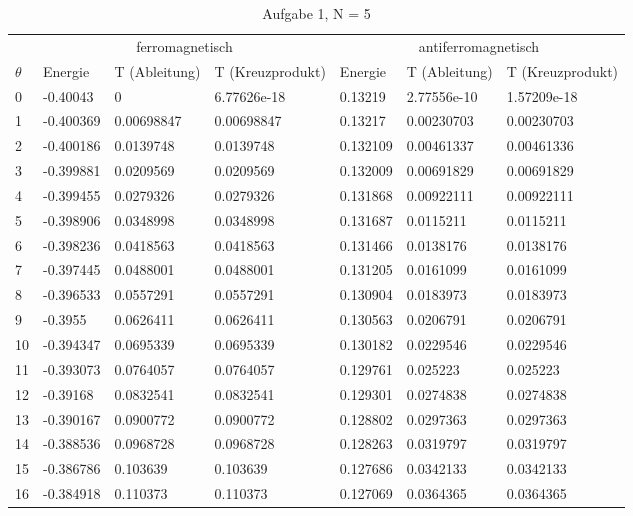 \begin{longtable}{l|lll|lll}
\caption[]{Aufgabe 1, N = 5}\\
\hline\hline
& \multicolumn{3}{c}{ferromagnetisch} & \multicolumn{3}{c}{antiferromagnetisch} \\
$\theta$ & Energie & T (Ableitung) & T (Kreuzprodukt) & Energie & T (Ableitung) & T (Kreuzprodukt) \\
\hline
\endhead
\hline
   0 & -0.40043     & 0           & 6.77626e-18 &  0.13219     & 2.77556e-10 & 1.57209e-18 \\
   1 & -0.400369    & 0.00698847  & 0.00698847  &  0.13217     & 0.00230703  & 0.00230703  \\
   2 & -0.400186    & 0.0139748   & 0.0139748   &  0.132109    & 0.00461337  & 0.00461336  \\
   3 & -0.399881    & 0.0209569   & 0.0209569   &  0.132009    & 0.00691829  & 0.00691829  \\
   4 & -0.399455    & 0.0279326   & 0.0279326   &  0.131868    & 0.00922111  & 0.00922111  \\
   5 & -0.398906    & 0.0348998   & 0.0348998   &  0.131687    & 0.0115211   & 0.0115211   \\
   6 & -0.398236    & 0.0418563   & 0.0418563   &  0.131466    & 0.0138176   & 0.0138176   \\
   7 & -0.397445    & 0.0488001   & 0.0488001   &  0.131205    & 0.0161099   & 0.0161099   \\
   8 & -0.396533    & 0.0557291   & 0.0557291   &  0.130904    & 0.0183973   & 0.0183973   \\
   9 & -0.3955      & 0.0626411   & 0.0626411   &  0.130563    & 0.0206791   & 0.0206791   \\
  10 & -0.394347    & 0.0695339   & 0.0695339   &  0.130182    & 0.0229546   & 0.0229546   \\
  11 & -0.393073    & 0.0764057   & 0.0764057   &  0.129761    & 0.025223    & 0.025223    \\
  12 & -0.39168     & 0.0832541   & 0.0832541   &  0.129301    & 0.0274838   & 0.0274838   \\
  13 & -0.390167    & 0.0900772   & 0.0900772   &  0.128802    & 0.0297363   & 0.0297363   \\
  14 & -0.388536    & 0.0968728   & 0.0968728   &  0.128263    & 0.0319797   & 0.0319797   \\
  15 & -0.386786    & 0.103639    & 0.103639    &  0.127686    & 0.0342133   & 0.0342133   \\
  16 & -0.384918    & 0.110373    & 0.110373    &  0.127069    & 0.0364365   & 0.0364365   \\

\end{longtable}
